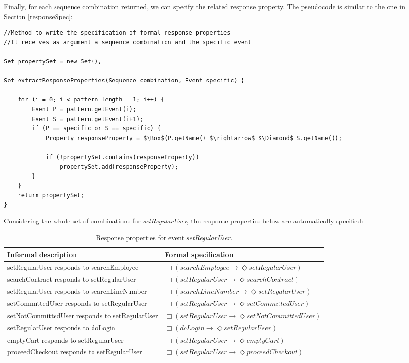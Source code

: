 Finally, for each sequence combination returned, we can specify the related response property. The pseudocode is similar to the one in Section \ref{responseSpec}:

\begin{lstlisting}[mathescape,caption={Pseudocode to extract response properties for a specific event}]
//Method to write the specification of formal response properties
//It receives as argument a sequence combination and the specific event 

Set propertySet = new Set();

Set extractResponseProperties(Sequence combination, Event specific) {

	for (i = 0; i < pattern.length - 1; i++) {
		Event P = pattern.getEvent(i);
		Event S = pattern.getEvent(i+1);
		if (P == specific or S == specific) {
			Property responseProperty = $\Box$(P.getName() $\rightarrow$ $\Diamond$ S.getName());

			if (!propertySet.contains(responseProperty))
				propertySet.add(responseProperty);
		}
	}
	return propertySet;
}
\end{lstlisting}

Considering the whole set of combinations for \textit{setRegularUser}, the response properties below are automatically specified:

\begin{table}[h]
\begin{center}
\begin{tabular}{|p{7cm}|l|}

\hline

Informal description & Formal specification \\ \hline

setRegularUser responds to searchEmployee & $\Box (searchEmployee \rightarrow \Diamond setRegularUser)$ \\ \hline
searchContract responds to setRegularUser & $\Box (setRegularUser \rightarrow \Diamond searchContract)$ \\ \hline
setRegularUser responds to searchLineNumber & $\Box (searchLineNumber \rightarrow \Diamond setRegularUser)$ \\ \hline
setCommittedUser responds to setRegularUser & $\Box (setRegularUser \rightarrow \Diamond setCommittedUser)$ \\ \hline
setNotCommittedUser responds to setRegularUser & $\Box (setRegularUser \rightarrow \Diamond setNotCommittedUser)$ \\ \hline
setRegularUser responds to doLogin & $\Box (doLogin \rightarrow \Diamond setRegularUser)$ \\ \hline
emptyCart responds to setRegularUser & $\Box (setRegularUser \rightarrow \Diamond emptyCart)$\\ \hline
proceedCheckout responds to setRegularUser & $\Box (setRegularUser \rightarrow \Diamond proceedCheckout)$ \\

\hline
\end{tabular}
\end{center}
\caption{Response properties for event \textit{setRegularUser}.}
\label{specificProperties}
\end{table}

